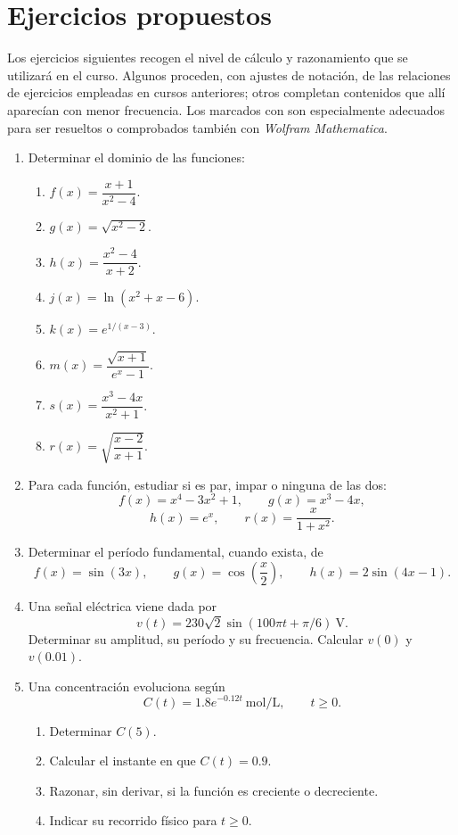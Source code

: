 \section*{Ejercicios propuestos}
\label{sec:ejercicios-t2}

Los ejercicios siguientes recogen el nivel de cálculo y razonamiento que se utilizará en el curso. Algunos proceden, con ajustes de notación, de las relaciones de ejercicios empleadas en cursos anteriores; otros completan contenidos que allí aparecían con menor frecuencia. Los marcados con \M son especialmente adecuados para ser resueltos o comprobados también con \textit{Wolfram Mathematica}.

\begin{enumerate}[label=\textbf{\arabic*.},leftmargin=*]

\item Determinar el dominio de las funciones:
\begin{enumerate}[label=\alph*)]
\item $f(x)=\dfrac{x+1}{x^2-4}$.
\item $g(x)=\sqrt{x^2-2}$.
\item $h(x)=\dfrac{x^2-4}{x+2}$.
\item $j(x)=\ln(x^2+x-6)$.
\item $k(x)=e^{1/(x-3)}$.
\item $m(x)=\dfrac{\sqrt{x+1}}{e^x-1}$.
\item $s(x)=\dfrac{x^3-4x}{x^2+1}$.
\item $r(x)=\sqrt{\dfrac{x-2}{x+1}}$.
\end{enumerate}

\item Para cada función, estudiar si es par, impar o ninguna de las dos:
\[
f(x)=x^4-3x^2+1,
\qquad
g(x)=x^3-4x,
\]
\[
h(x)=e^x,
\qquad
r(x)=\frac{x}{1+x^2}.
\]

\item Determinar el período fundamental, cuando exista, de
\[
f(x)=\sin(3x),
\qquad
g(x)=\cos\left(\frac{x}{2}\right),
\qquad
h(x)=2\sin(4x-1).
\]

\item Una señal eléctrica viene dada por
\[
v(t)=230\sqrt2\sin(100\pi t+\pi/6)\ \mathrm{V}.
\]
Determinar su amplitud, su período y su frecuencia. Calcular $v(0)$ y $v(0.01)$.

\item Una concentración evoluciona según
\[
C(t)=1.8e^{-0.12t}\ \mathrm{mol/L},\qquad t\geq0.
\]
\begin{enumerate}[label=\alph*)]
\item Determinar $C(5)$.
\item Calcular el instante en que $C(t)=0.9$.
\item Razonar, sin derivar, si la función es creciente o decreciente.
\item Indicar su recorrido físico para $t\geq0$.
\end{enumerate}


\end{enumerate}
